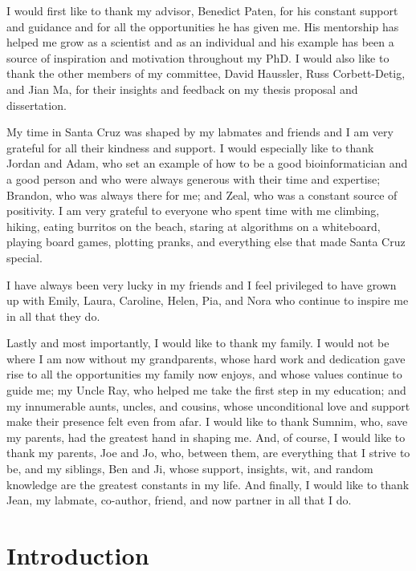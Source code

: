 \documentclass[11pt]{ucscthesis}
\begin{document}
\begin{frontmatter}
\begin{acknowledgements}
I would first like to thank my advisor, Benedict Paten, for his constant support and guidance and for all the opportunities he has given me.
His mentorship has helped me grow as a scientist and as an individual and his example has been a source of inspiration and motivation throughout my PhD.
I would also like to thank the other members of my committee, David Haussler, Russ Corbett-Detig, and Jian Ma, for their insights and feedback on my thesis proposal and dissertation.

My time in Santa Cruz was shaped by my labmates and friends and I am very grateful for all their kindness and support.
I would especially like to thank Jordan and Adam, who set an example of how to be a good bioinformatician and a good person and who were always generous with their time and expertise; Brandon, who was always there for me; and Zeal, who was a constant source of positivity. 
I am very grateful to everyone who spent time with me climbing, hiking, eating burritos on the beach, staring at algorithms on a whiteboard, playing board games, plotting pranks, and everything else that made Santa Cruz special.

I have always been very lucky in my friends and I feel privileged to have grown up with Emily, Laura, Caroline, Helen, Pia, and Nora who continue to inspire me in all that they do.

Lastly and most importantly, I would like to thank my family.
I would not be where I am now without my grandparents, whose hard work and dedication gave rise to all the opportunities my family now enjoys, and whose values continue to guide me; my Uncle Ray, who helped me take the first step in my education; and my innumerable aunts, uncles, and cousins, whose unconditional love and support make their presence felt even from afar.
I would like to thank Sumnim, who, save my parents, had the greatest hand in shaping me.
And, of course, I would like to thank my parents, Joe and Jo, who, between them, are everything that I strive to be, and my siblings, Ben and Ji, whose support, insights, wit, and random knowledge are the greatest constants in my life.
And finally, I would like to thank Jean, my labmate, co-author, friend, and now partner in all that I do.

\end{acknowledgements}

\end{frontmatter}


\chapter{Introduction}
\end{document}
